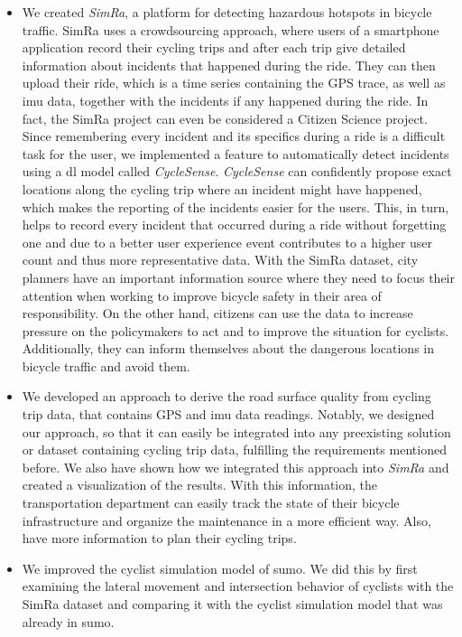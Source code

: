 \begin{itemize}
\item We created \textit{SimRa}, a platform for detecting hazardous hotspots in bicycle traffic.
SimRa uses a crowdsourcing approach, where users of a smartphone application record their cycling trips and after each trip give detailed information about incidents that happened during the ride.
They can then upload their ride, which is a time series containing the GPS trace, as well as \ac{imu} data, together with the incidents if any happened during the ride.
In fact, the SimRa project can even be considered a Citizen Science project.
Since remembering every incident and its specifics during a ride is a difficult task for the user, we implemented a feature to automatically detect incidents using a \ac{dl} model called \textit{CycleSense}.
\textit{CycleSense} can confidently propose exact locations along the cycling trip where an incident might have happened, which makes the reporting of the incidents easier for the users.
This, in turn, helps to record every incident that occurred during a ride without forgetting one and due to a better user experience event contributes to a higher user count and thus more representative data. 
With the SimRa dataset, city planners have an important information source where they need to focus their attention when working to improve bicycle safety in their area of responsibility.
On the other hand, citizens can use the data to increase pressure on the policymakers to act and to improve the situation for cyclists.
Additionally, they can inform themselves about the dangerous locations in bicycle traffic and avoid them.
\item We developed an approach to derive the road surface quality from cycling trip data, that contains GPS and \ac{imu} data readings.
Notably, we designed our approach, so that it can easily be integrated into any preexisting solution or dataset containing cycling trip data, fulfilling the requirements mentioned before.
We also have shown how we integrated this approach into \textit{SimRa} and created a visualization of the results.
With this information, the transportation department can easily track the state of their bicycle infrastructure and organize the maintenance in a more efficient way.
Also, have more information to plan their cycling trips.
\item We improved the cyclist simulation model of \ac{sumo}.
We did this by first examining the lateral movement and intersection behavior of cyclists with the SimRa dataset and comparing it with the cyclist simulation model that was already in \ac{sumo}. 

\end{itemize}
